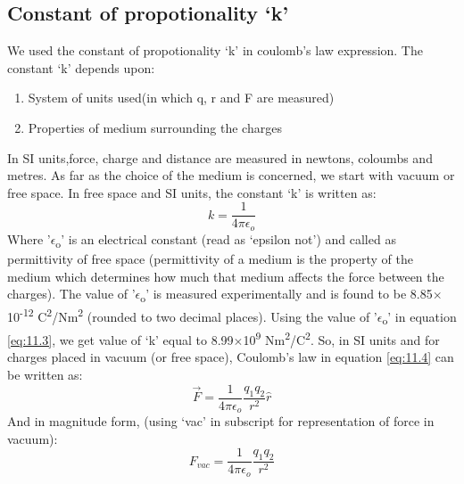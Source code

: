 \subsection*{Constant of propotionality ‘k’}
We used the constant of propotionality ‘k’ in coulomb’s law expression.
The constant ‘k’ depends upon:
\begin{enumerate}[label=(\alph*)]
\item System of units used(in which q, r and F are measured)
\item Properties of medium surrounding the charges
\end{enumerate}
In SI units,force, charge and distance are measured in newtons,
coloumbs and metres. As far as the choice of the medium is concerned,
we start with vacuum or free space. In free space and SI units,
the constant ‘k’ is written as:
\begin{equation}\label{eq:11.3}
  k = \frac{1}{4\pi\epsilon_{o}}
\end{equation}
Where '$\epsilon$\textsubscript{o}' is an electrical constant (read as ‘epsilon not’) and called
as permittivity of free space (permittivity of a medium is the property
of the medium which determines how much that medium affects the force
between the charges).
The value of '$\epsilon$\textsubscript{o}' is measured experimentally and
is found to be 8.85$\times$10\textsuperscript{-12} C\textsuperscript{2}/Nm\textsuperscript{2} (rounded to two decimal places).
Using the value of '$\epsilon$\textsubscript{o}' in equation \ref{eq:11.3}, we get value of ‘k’ equal to
8.99$\times$10\textsuperscript{9} Nm\textsuperscript{2}/C\textsuperscript{2}.
So, in SI units and for charges placed in vacuum (or free space),
Coulomb’s law in equation \ref{eq:11.4} can be written as:
\begin{equation}\label{eq:11.4}
  \vec{F} = \frac{1}{4\pi\epsilon_{o}} \frac{q_{1}q_{2}}{r^{2}} \hat{r}
\end{equation}
And in magnitude form,
(using ‘vac’ in subscript for representation of force in vacuum):
\begin{equation}\label{eq:11.5}
  F_{vac} = \frac{1}{4\pi\epsilon_{o}} \frac{q_{1}q_{2}}{r^{2}}
\end{equation}

